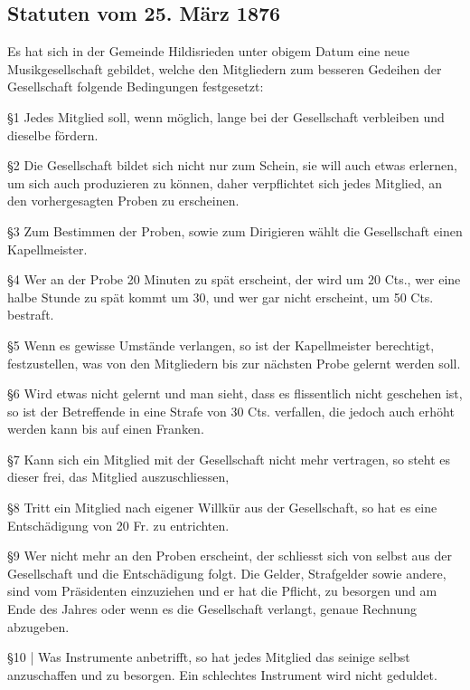 \begin{multicols}{2}

    \subsection{Statuten vom 25. März 1876}

    Es hat sich in der Gemeinde Hildisrieden unter obigem Datum eine neue
    Musikgesellschaft gebildet, welche den Mitgliedern zum besseren Gedeihen der
    Gesellschaft folgende Bedingungen festgesetzt:

    \S1 Jedes Mitglied soll, wenn möglich, lange bei der Gesellschaft verbleiben
    und dieselbe fördern.

    \S2 Die Gesellschaft bildet sich nicht nur zum Schein, sie will auch etwas
    erlernen, um sich auch produzieren zu können, daher verpflichtet sich jedes
    Mitglied, an den vorhergesagten Proben zu erscheinen.

    \S3 Zum Bestimmen der Proben, sowie zum Dirigieren wählt die Gesellschaft
    einen Kapellmeister.

    \S4 Wer an der Probe 20 Minuten zu spät erscheint, der wird um 20 Cts., wer
    eine halbe Stunde zu spät kommt um 30, und wer gar nicht erscheint, um 50
    Cts. bestraft.

    \S5 Wenn es gewisse Umstände verlangen, so ist der Kapellmeister berechtigt,
    festzustellen, was von den Mitgliedern bis zur nächsten Probe gelernt werden
    soll.

    \S6 Wird etwas nicht gelernt und man sieht, dass es flissentlich nicht
    geschehen ist, so ist der Betreffende in eine Strafe von 30 Cts. verfallen,
    die jedoch auch erhöht werden kann bis auf einen Franken.

    \S7 Kann sich ein Mitglied mit der Gesellschaft nicht mehr vertragen, so
    steht es dieser frei, das Mitglied auszuschliessen,

    \S8 Tritt ein Mitglied nach eigener Willkür aus der Gesellschaft, so hat es
    eine Entschädigung von 20 Fr. zu entrichten.

    \S9 Wer nicht mehr an den Proben erscheint, der schliesst sich von selbst
    aus der Gesellschaft und die Entschädigung folgt. Die Gelder, Strafgelder
    sowie andere, sind vom Präsidenten einzuziehen und er hat die Pflicht, zu
    besorgen und am Ende des Jahres oder wenn es die Gesellschaft verlangt,
    genaue Rechnung abzugeben.

    \S10 | Was Instrumente anbetrifft, so hat jedes Mitglied das seinige selbst
    anzuschaffen und zu besorgen. Ein schlechtes Instrument wird nicht geduldet.


\end{multicols}
